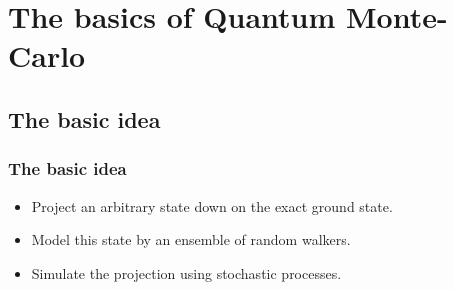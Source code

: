 \section{The basics of Quantum Monte-Carlo}

%  
%  
%  
%  
%  

 

\subsection{The basic idea}

\begin{frame}

\frametitle{The basic idea}

\begin{itemize}
  \item Project an arbitrary state down on the exact ground state.
  \item Model this state by an ensemble of random walkers.
  \item Simulate the projection using stochastic processes.
\end{itemize}

\end{frame}


